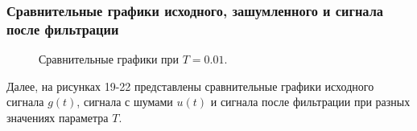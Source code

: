 \documentclass[a5paper, 10pt]{article}
\theoremstyle{definition}
\theoremstyle{plain}
\theoremstyle{remark}
\begin{document}
\subsubsection{Сравнительные графики исходного, зашумленного и сигнала после фильтрации}
\begin{figure}[h!]
\caption{Сравнительные графики при $T = 0.01$.}
\end{figure}

Далее, на рисунках 19-22 представлены сравнительные графики исходного сигнала $g(t)$, сигнала с шумами $u(t)$ и сигнала после фильтрации при разных значениях параметра $T$.
\end{document}
